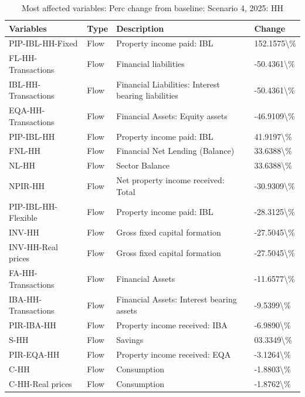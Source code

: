 \documentclass[
]{book}
\begin{document}
\begin{table}

\caption{\label{tab:most-affected-Scenario-4-2025-perc-HH}Most affected variables: Perc change from baseline: Scenario 4, 2025: HH}
\centering
\fontsize{10}{12}\selectfont
\begin{tabular}[t]{l|l|l|l}
\hline
Variables & Type & Description & Change\\
\hline
PIP-IBL-HH-Fixed & Flow & Property income paid: IBL & 152.1575\textbackslash{}\%\\
\hline
FL-HH-Transactions & Flow & Financial liabilities & -50.4361\textbackslash{}\%\\
\hline
IBL-HH-Transactions & Flow & Financial Liabilities: Interest bearing liabilities & -50.4361\textbackslash{}\%\\
\hline
EQA-HH-Transactions & Flow & Financial Assets: Equity assets & -46.9109\textbackslash{}\%\\
\hline
PIP-IBL-HH & Flow & Property income paid: IBL & 41.9197\textbackslash{}\%\\
\hline
FNL-HH & Flow & Financial Net Lending (Balance) & 33.6388\textbackslash{}\%\\
\hline
NL-HH & Flow & Sector Balance & 33.6388\textbackslash{}\%\\
\hline
NPIR-HH & Flow & Net property income received: Total & -30.9309\textbackslash{}\%\\
\hline
PIP-IBL-HH-Flexible & Flow & Property income paid: IBL & -28.3125\textbackslash{}\%\\
\hline
INV-HH & Flow & Gross fixed capital formation & -27.5045\textbackslash{}\%\\
\hline
INV-HH-Real prices & Flow & Gross fixed capital formation & -27.5045\textbackslash{}\%\\
\hline
FA-HH-Transactions & Flow & Financial Assets & -11.6577\textbackslash{}\%\\
\hline
IBA-HH-Transactions & Flow & Financial Assets: Interest bearing assets & -9.5399\textbackslash{}\%\\
\hline
PIR-IBA-HH & Flow & Property income received: IBA & -6.9890\textbackslash{}\%\\
\hline
S-HH & Flow & Savings & 03.3349\textbackslash{}\%\\
\hline
PIR-EQA-HH & Flow & Property income received: EQA & -3.1264\textbackslash{}\%\\
\hline
C-HH & Flow & Consumption & -1.8803\textbackslash{}\%\\
\hline
C-HH-Real prices & Flow & Consumption & -1.8762\textbackslash{}\%\\

\end{tabular}
\end{table}
\end{document}
